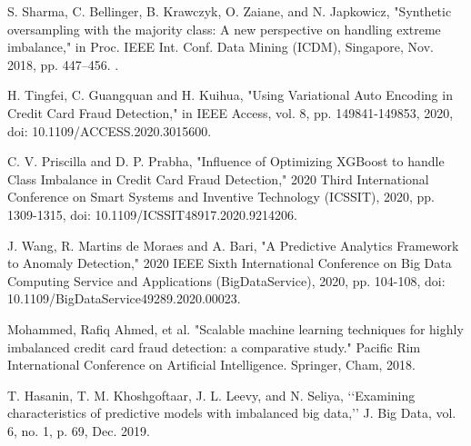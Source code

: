 \documentclass[a4paper, 12pt]{article}
\begin{document}
\newpage
%
%


\begin{thebibliography}{21}
 S. Sharma, C. Bellinger, B. Krawczyk, O. Zaiane, and N. Japkowicz, "Synthetic oversampling with the majority class: A new perspective on handling extreme imbalance," in Proc. IEEE Int. Conf. Data Mining (ICDM), Singapore, Nov. 2018, pp. 447–456. .

 H. Tingfei, C. Guangquan and H. Kuihua, "Using Variational Auto Encoding in Credit Card Fraud Detection," in IEEE Access, vol. 8, pp. 149841-149853, 2020, doi: 10.1109/ACCESS.2020.3015600.

 C. V. Priscilla and D. P. Prabha, "Influence of Optimizing XGBoost to handle Class Imbalance in Credit Card Fraud Detection," 2020 Third International Conference on Smart Systems and Inventive Technology (ICSSIT), 2020, pp. 1309-1315, doi: 10.1109/ICSSIT48917.2020.9214206.

 J. Wang, R. Martins de Moraes and A. Bari, "A Predictive Analytics Framework to Anomaly Detection," 2020 IEEE Sixth International Conference on Big Data Computing Service and Applications (BigDataService), 2020, pp. 104-108, doi: 10.1109/BigDataService49289.2020.00023.

 Mohammed, Rafiq Ahmed, et al. "Scalable machine learning techniques for highly imbalanced credit card fraud detection: a comparative study." Pacific Rim International Conference on Artificial Intelligence. Springer, Cham, 2018.


 T. Hasanin, T. M. Khoshgoftaar, J. L. Leevy, and N. Seliya, ‘‘Examining characteristics of predictive models with imbalanced big data,’’ J. Big Data, vol. 6, no. 1, p. 69, Dec. 2019.






\end{thebibliography}
\end{document}

